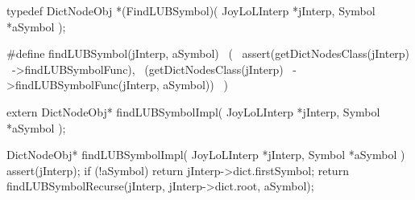 \startCHeader
typedef DictNodeObj *(FindLUBSymbol)(
  JoyLoLInterp *jInterp,
  Symbol       *aSymbol
);

#define findLUBSymbol(jInterp, aSymbol)       \
  (                                           \
    assert(getDictNodesClass(jInterp)      \
      ->findLUBSymbolFunc),                   \
    (getDictNodesClass(jInterp)            \
      ->findLUBSymbolFunc(jInterp, aSymbol))  \
  )
\stopCHeader

\setCHeaderStream{private}
\startCHeader
extern DictNodeObj* findLUBSymbolImpl(
  JoyLoLInterp *jInterp,
  Symbol       *aSymbol
);
\stopCHeader
{}

\startCCode
DictNodeObj* findLUBSymbolImpl(
  JoyLoLInterp *jInterp,
  Symbol       *aSymbol
) {
  assert(jInterp);
  if (!aSymbol) return jInterp->dict.firstSymbol;
  return findLUBSymbolRecurse(jInterp, jInterp->dict.root, aSymbol);
}
\stopCCode
